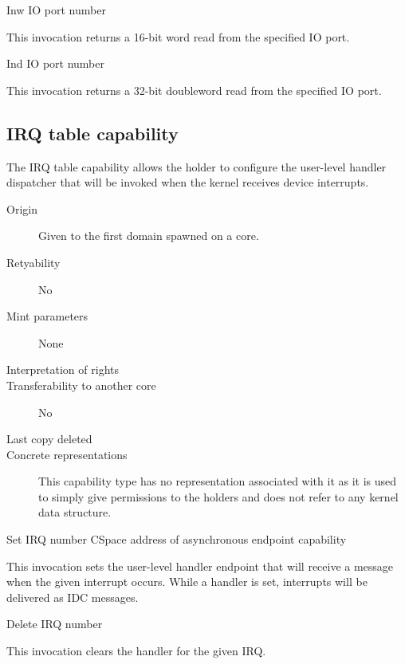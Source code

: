 \begin{invocation}{Inw}
  \arg IO port number
\end{invocation}
This invocation returns a 16-bit word read from the specified IO port.

\begin{invocation}{Ind}
  \arg IO port number
\end{invocation}
This invocation returns a 32-bit doubleword read from the specified IO port.

\subsection{IRQ table capability}
The IRQ table capability allows the holder to configure the user-level
handler dispatcher that will be invoked when the kernel receives
device interrupts.

\begin{description}
\item[Origin] Given to the first domain spawned on a core.
  
\item[Retyability] No
  
\item[Mint parameters] None
  
\item[Interpretation of rights] 
  
\item[Transferability to another core] No

\item[Last copy deleted] 
  
\item[Concrete representations] This capability type has no
  representation associated with it as it is used to simply give
  permissions to the holders and does not refer to any kernel data
  structure.
  \end{description}

\begin{invocation}{Set}
  \arg IRQ number
  \arg CSpace address of asynchronous endpoint capability
\end{invocation}
This invocation sets the user-level handler endpoint that will receive
a message when the given interrupt occurs.  While a handler is set,
interrupts will be delivered as IDC messages.


\begin{invocation}{Delete}
  \arg IRQ number
\end{invocation}
This invocation clears the handler for the given IRQ.

